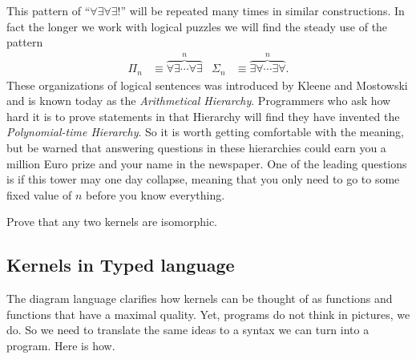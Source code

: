 \documentclass[12pt,twoside,dvipsnames,letterpaper]{memoir}
\begin{document}
This pattern of 
``$\forall \exists\forall\exists!$'' will be repeated many times in similar 
constructions.  In fact the longer we work with logical puzzles we will 
find the steady use of the pattern 
\begin{align*}
    \Pi_n & \equiv \overbrace{\forall \exists\cdots \forall \exists}^n
    & 
    \Sigma_n & \equiv \overbrace{\exists\forall\cdots \exists\forall}^n.
\end{align*}
These organizations of logical sentences was introduced by Kleene and 
Mostowski and is known today as the \emph{Arithmetical Hierarchy}.
Programmers who ask how hard it is to prove statements in that Hierarchy 
will find they have invented the \emph{Polynomial-time Hierarchy}.
So it is worth getting comfortable with the meaning, but be warned 
that answering questions in these hierarchies could earn you a million Euro 
prize and your name in the newspaper.  One of the leading questions 
is if this tower may one day collapse, meaning that you only need to go 
to some fixed value of $n$ before you know everything.

\begin{prob} 
    Prove that any two kernels are isomorphic.
\end{prob}




\subsection{Kernels in Typed language}

The diagram language clarifies how kernels can be thought of as functions and 
functions that have a maximal quality.  Yet, programs do not think in pictures, 
we do.  So we need to translate the same ideas to a syntax we can turn into a 
program.  Here is how.
\end{document}
